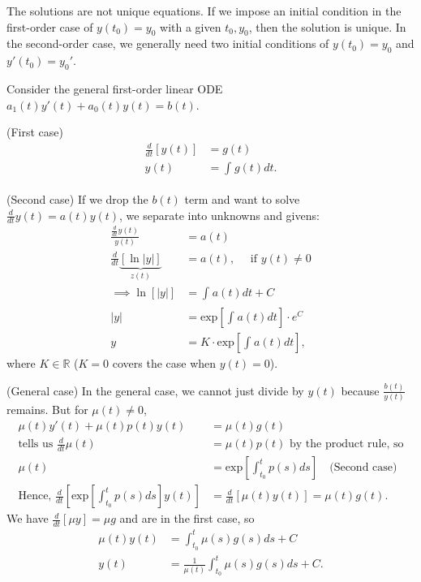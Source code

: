 \documentclass{tufte-handout}
\newcommand*\R{\mathbb{R}}
\theoremstyle{definition}
\begin{document}
The solutions are not unique equations. If we impose an initial condition in the first-order case of $y(t_0) = y_0$ with a given $t_0, y_0$, then the solution is unique. In the second-order case, we generally need two initial conditions of $y(t_0) = y_0$ and $y'(t_0) = y_0'$. 

Consider the general first-order linear ODE $a_1(t)y'(t) + a_0(t)y(t) = b(t)$.

(First case)
\begin{align*}
	\frac{d}{dt}\left[ y(t) \right] &= g(t) \\
	y(t) &= \int_{}^{} g(t)dt 
.\end{align*} 

(Second case) If we drop the $b(t)$ term and want to solve $\frac{d}{dt} y(t) = a(t) y(t)$, we separate into unknowns and givens:
\begin{align*}
	\frac{\frac{d}{dt}y(t)}{y(t)} &=  a(t) \\
	\frac{d}{dt}\underbrace{\left[ \ln{|y|} \right]}_{z(t)} &= a(t), \quad \text{ if } y(t) \ne 0 \\
	\implies \ln\left[ |y| \right]  &= \int_{}^{} a(t)dt + C  \\
	\left| y \right| &=  \text{exp}\left[ \int_{}^{} a(t)dt  \right] \cdot e^{C} \\
	y &= K \cdot \text{exp}\left[ \int_{}^{} a(t)dt  \right] 
,\end{align*}
where $K \in \R$ ($K = 0$ covers the case when $y(t) = 0$).

(General case) In the general case, we cannot just divide by $y(t)$ because $\frac{b(t)}{y(t)}$ remains. But for $\mu(t) \ne 0$, 
\begin{align*}
	\mu(t) y'(t) + \mu(t) p(t) y(t) &= \mu(t) g(t) \\
	\text{tells us } \frac{d}{dt} \mu(t) &= \mu(t) p(t) \text{ by the product rule, so} \\ \mu(t) &= \text{exp}\left[ \int_{t_0}^{t} p(s)ds  \right]  \quad \text{(Second case)} \\
	\text{Hence, } \frac{d}{dt} \left[\text{exp}\left[ \int_{t_0}^{t} p(s)ds  \right] y(t) \right] &= \frac{d}{dt}\left[ \mu(t) y(t) \right] = \mu(t) g(t).
\end{align*}
We have $\frac{d}{dt}\left[ \mu y \right] = \mu g$ and are in the first case, so
\begin{align*}
	\mu(t) y(t) &= \int_{t_0}^{t} \mu(s) g(s)ds + C  \\
	y(t) &= \frac{1}{\mu(t)} \int_{t_0}^{t} \mu(s) g(s)ds + C
.\end{align*}
\end{document}
